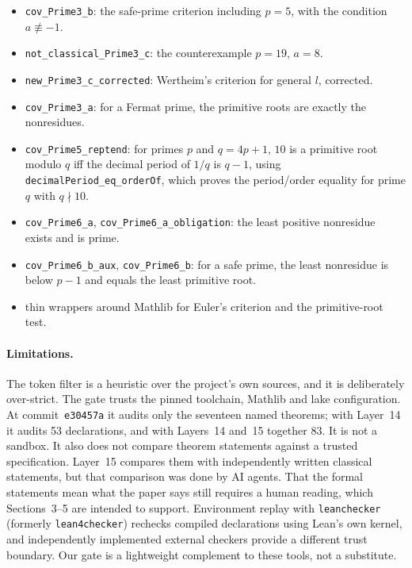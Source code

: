\documentclass[11pt]{article}
\theoremstyle{remark}
\newcommand{\lean}[1]{\texttt{#1}}
\newcommand{\commit}{e30457a}
\begin{document}
\begin{itemize}
\item \lean{cov\_Prime3\_b}: the safe-prime criterion including $p=5$, with the condition $a\not\equiv-1$.
\item \lean{not\_classical\_Prime3\_c}: the counterexample $p=19$, $a=8$.
\item \lean{new\_Prime3\_c\_corrected}: Wertheim's criterion for general $l$, corrected.
\item \lean{cov\_Prime3\_a}: for a Fermat prime, the primitive roots are exactly the nonresidues.
\item \lean{cov\_Prime5\_reptend}: for primes $p$ and $q=4p+1$, $10$ is a primitive root modulo $q$
iff the decimal period of $1/q$ is $q-1$, using \lean{decimalPeriod\_eq\_orderOf}, which proves the
period/order equality for prime $q$ with $q\nmid10$.
\item \lean{cov\_Prime6\_a}, \lean{cov\_Prime6\_a\_obligation}: the least positive nonresidue exists and is prime.
\item \lean{cov\_Prime6\_b\_aux}, \lean{cov\_Prime6\_b}: for a safe prime, the least nonresidue is
below $p-1$ and equals the least primitive root.
\item thin wrappers around Mathlib for Euler's criterion and the primitive-root test.
\end{itemize}

\paragraph{Limitations.}
The token filter is a heuristic over the project's own sources, and it is deliberately
over-strict. The gate trusts the pinned toolchain, Mathlib and lake configuration. At commit~\texttt{\commit} it
audits only the seventeen named theorems; with Layer~14 it audits 53 declarations, and with
Layers~14 and~15 together 83. It is not a sandbox. It also does not compare theorem statements against a trusted specification. Layer~15 compares
them with independently written classical statements, but that comparison was done by AI agents. That
the formal statements mean what the paper says still requires a human reading, which
Sections~3--5 are intended to support. Environment replay with \texttt{leanchecker} (formerly
\texttt{lean4checker}) rechecks compiled declarations using Lean's own kernel, and independently
implemented external checkers provide a different trust boundary. Our gate is a lightweight
complement to these tools, not a substitute.
\end{document}
